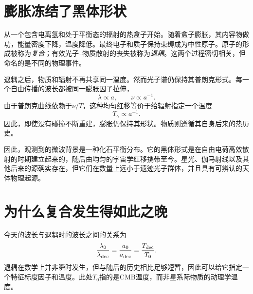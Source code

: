 \begin{classroomqa}
\end{classroomqa}

\section{膨胀冻结了黑体形状}

从一个包含电离氢和处于平衡态的辐射的热盒子开始。随着盒子膨胀，其内容物做功，能量密度下降，温度降低。最终电子和质子保持束缚成为中性原子。原子的形成被称为\emph{复合}；有效光子--物质散射的丧失被称为\emph{退耦}。这两个过程密切相关，但命名的是不同的物理事件。

退耦之后，物质和辐射不再共享同一温度。然而光子谱仍保持其普朗克形式。每一个自由传播的波长都被同一膨胀因子拉伸，
\begin{equation}
\lambda\propto a,
\qquad
\nu\propto a^{-1}.
\end{equation}
由于普朗克曲线依赖于\(\nu/T\)，这种均匀红移等价于给辐射指定一个温度
\begin{equation}
\boxed{T_\gamma\propto a^{-1}.}
\label{eq:c07-temperature-scaling}
\end{equation}
因此，即使没有碰撞不断重建，膨胀仍保持其形状。物质则遵循其自身后来的热历史。

因此，观测到的微波背景是一种化石平衡分布。它的黑体形式是在自由电荷高效散射的时期建立起来的，随后由均匀的宇宙学红移携带至今。星光、伽马射线以及其他后来的源确实存在，但它们在数量上远小于遗迹光子群体，并且具有可辨认的天体物理起源。

\begin{classroomqa}
\end{classroomqa}

\section{为什么复合发生得如此之晚}

今天的波长与退耦时的波长之间的关系为
\begin{equation}
\frac{\lambda_0}{\lambda_{\rm dec}}
=
\frac{a_0}{a_{\rm dec}}
=
\frac{T_{\rm dec}}{T_0}.
\label{eq:c07-decoupling-ratio}
\end{equation}
退耦在数学上并非瞬时发生，但与随后的历史相比足够短暂，因此可以给它指定一个特征标度因子和温度。此处\(T_0\)指的是CMB温度，而非星系际物质的动理学温度。

